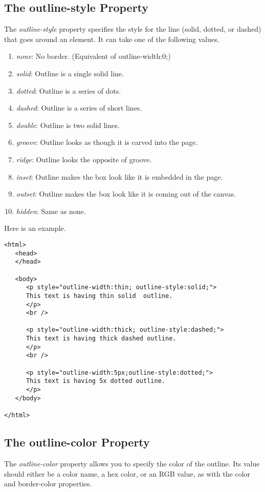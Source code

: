 \documentclass[a4paper,oneside]{book}
\numberwithin{equation}{chapter}
\begin{document}
\subsection{The outline-style Property}
The \textit{outline-style} property specifies the style for the line (solid, dotted, or dashed) that goes around an element. It can take one of the following values.
\begin{enumerate}
\item \textit{none}: No border. (Equivalent of outline-width:0;)
\item \textit{solid}: Outline is a single solid line.
\item \textit{dotted}: Outline is a series of dots.
\item \textit{dashed}: Outline is a series of short lines.
\item \textit{double}: Outline is two solid lines.
\item \textit{groove}: Outline looks as though it is carved into the page.
\item \textit{ridge}: Outline looks the opposite of groove.
\item \textit{inset}: Outline makes the box look like it is embedded in the page.
\item \textit{outset}: Outline makes the box look like it is coming out of the canvas.
\item \textit{hidden}: Same as none.
\end{enumerate}
Here is an example.
\begin{verbatim}
<html>
   <head>
   </head>
   
   <body>
      <p style="outline-width:thin; outline-style:solid;">
      This text is having thin solid  outline.
      </p>
      <br />
      
      <p style="outline-width:thick; outline-style:dashed;">
      This text is having thick dashed outline.
      </p>
      <br />
      
      <p style="outline-width:5px;outline-style:dotted;">
      This text is having 5x dotted outline.
      </p>
   </body>
   
</html> 
\end{verbatim}
\subsection{The outline-color Property}
The \textit{outline-color} property allows you to specify the color of the outline. Its value should either be a color name, a hex color, or an RGB value, as with the color and border-color properties.
\end{document}
